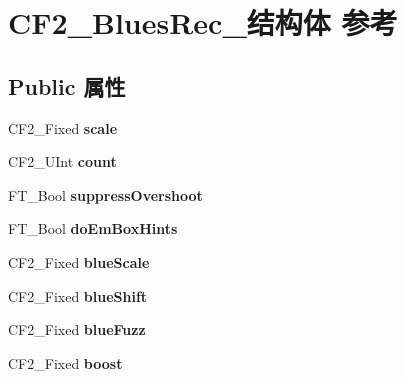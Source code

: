 \hypertarget{struct_c_f2___blues_rec__}{}\section{C\+F2\+\_\+\+Blues\+Rec\+\_\+结构体 参考}
\label{struct_c_f2___blues_rec__}
\subsection*{Public 属性}
\begin{DoxyCompactItemize}
\item 
\mbox{\label{struct_c_f2___blues_rec___aeea3ec6599962b87c909375f6f8e6ebd}} 
C\+F2\+\_\+\+Fixed {\bfseries scale}
\item 
\mbox{\label{struct_c_f2___blues_rec___aa26bfc6018fc22ff99c52cff654760da}} 
C\+F2\+\_\+\+U\+Int {\bfseries count}
\item 
\mbox{\label{struct_c_f2___blues_rec___a1ad38f3c703062e465051206937cb135}} 
F\+T\+\_\+\+Bool {\bfseries suppress\+Overshoot}
\item 
\mbox{\label{struct_c_f2___blues_rec___aa3d6184700d932ef2c77fe746491d09d}} 
F\+T\+\_\+\+Bool {\bfseries do\+Em\+Box\+Hints}
\item 
\mbox{\label{struct_c_f2___blues_rec___a7abf1d72e954c0d73977f279a5bacc8a}} 
C\+F2\+\_\+\+Fixed {\bfseries blue\+Scale}
\item 
\mbox{\label{struct_c_f2___blues_rec___a1abc851e3269c00c08facf4f1efd0c29}} 
C\+F2\+\_\+\+Fixed {\bfseries blue\+Shift}
\item 
\mbox{\label{struct_c_f2___blues_rec___a030e0fc620579216f6cc184e2874c230}} 
C\+F2\+\_\+\+Fixed {\bfseries blue\+Fuzz}
\item 
\mbox{\label{struct_c_f2___blues_rec___a9f2132c2ecc4ee31c571f0f6daf96a2e}} 
C\+F2\+\_\+\+Fixed {\bfseries boost}
\item 
\mbox{\label{struct_c_f2___blues_rec___ab9916b4121e19269a4a0a47f3b188c0c}} 

\end{DoxyCompactItemize}
